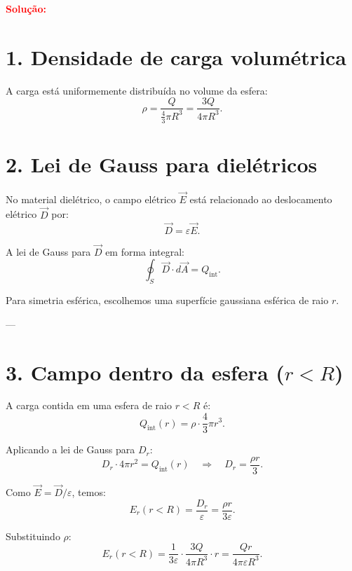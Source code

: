 \documentclass[a4paper,12pt]{article}
\begin{document}
\begin{flushleft}
\begin{center}
\end{center}

\textcolor{red}{\textbf{Solução:}}\\

\section*{1. Densidade de carga volumétrica}

A carga está uniformemente distribuída no volume da esfera:
\[
\rho = \frac{Q}{\frac{4}{3} \pi R^3} = \frac{3Q}{4\pi R^3}.
\]

\section*{2. Lei de Gauss para dielétricos}

No material dielétrico, o campo elétrico \( \vec{E} \) está relacionado ao deslocamento elétrico \( \vec{D} \) por:
\[
\vec{D} = \varepsilon \vec{E}.
\]

A lei de Gauss para \( \vec{D} \) em forma integral:
\[
\oint_{S} \vec{D} \cdot d\vec{A} = Q_{\text{int}}.
\]

Para simetria esférica, escolhemos uma superfície gaussiana esférica de raio \( r \).  

---

\section*{3. Campo dentro da esfera (\( r < R \))}

A carga contida em uma esfera de raio \( r < R \) é:
\[
Q_{\text{int}}(r) = \rho \cdot \frac{4}{3} \pi r^3.
\]

Aplicando a lei de Gauss para \( D_r \):
\[
D_r \cdot 4\pi r^2 = Q_{\text{int}}(r) \quad \Rightarrow \quad D_r = \frac{\rho r}{3}.
\]

Como \( \vec{E} = \vec{D}/\varepsilon \), temos:
\[
E_r(r<R) = \frac{D_r}{\varepsilon} = \frac{\rho r}{3\varepsilon}.
\]

Substituindo \(\rho\):
\[
E_r(r<R) =
\frac{1}{3\varepsilon} \cdot \frac{3Q}{4\pi R^3} \cdot r =
\frac{Q r}{4\pi \varepsilon R^3}.
\]


\end{flushleft}
\end{document}
